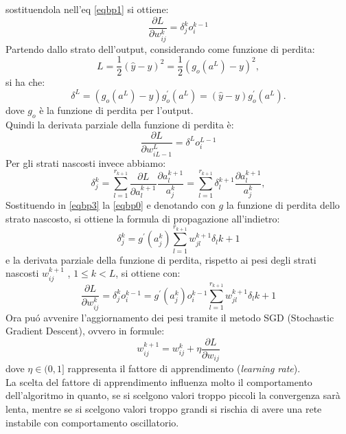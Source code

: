\documentclass[a4paper,12pt]{report}
\begin{document}
sostituendola nell'eq \ref{eqbp1} si ottiene:
\begin{equation}
\frac{\partial L}{\partial w_{ij}^k}=\delta_j^k o_i^{k-1}
\end{equation}
Partendo dallo strato dell'output, considerando come funzione di perdita: $$L=\frac{1}{2}(\hat{y}-y)^2=\frac{1}{2}(g_o(a^L)-y)^2,$$
si ha che:
\begin{equation}
\delta^{L}=(g_o(a^L)-y)g_o^{\prime}(a^L)=(\hat{y}-y)g_o^{\prime}(a^L).
\end{equation}
dove $g_o$ \`e la funzione di perdita per l'output.\\
Quindi la derivata parziale della funzione di perdita \`e:
\begin{equation}
\frac{\partial L}{\partial w_{iL-1}^L}=\delta^L o_i^{L-1}
\end{equation}
Per gli strati nascosti invece abbiamo:
\begin{equation}\label{eqbp3}
\delta_j^k=\sum_{l=1}^{r_{k+1}}\frac{\partial L}{\partial a_l^{k+1}}\frac{\partial a_l^{k+1}}{a_j^k}=\sum_{l=1}^{r_{k+1}} \delta_l^{k+1} \frac{\partial a_l^{k+1}}{a_j^k},
\end{equation}
Sostituendo in \ref{eqbp3} la \ref{eqbp0} e denotando con $g$ la funzione di perdita dello strato nascosto, si ottiene la formula di propagazione all'indietro:
\begin{equation}
\delta_j^k=g^{\prime}(a_j^k)\sum_{l=1}^{r_{k+1}}w_{jl}^{k+1}\delta_l{k+1}
\end{equation} 
e la derivata parziale della funzione di perdita, rispetto ai pesi degli strati nascosti $w_{ij}^{k+1}$ , $1\leq k < L$, si ottiene con:
\begin{equation}
\frac{\partial L}{\partial w_{ij}^k}=\delta_j^k o_i^{k-1}=g^{\prime}(a_j^k)o_i^{k-1}\sum_{l=1}^{r_{k+1}}w_{jl}^{k+1}\delta_l{k+1}
\end{equation}
Ora pu\'{o} avvenire l'aggiornamento dei pesi tramite il metodo SGD (Stochastic Gradient Descent), ovvero in formule:
\begin{equation}\label{eqbp4}
w_{ij}^{k+1}=w_{ij}^k + \eta \frac{\partial L}{\partial w_{ij}}
\end{equation}
dove $\eta \in (0,1]$ rappresenta il fattore di apprendimento (\textit{learning rate}).\\
La scelta del fattore di apprendimento influenza molto il comportamento dell'algoritmo in quanto, se si scelgono valori troppo piccoli la convergenza sar\`{a} lenta, mentre se si scelgono valori troppo grandi si rischia di avere una rete instabile con comportamento oscillatorio.\\
\end{document}
